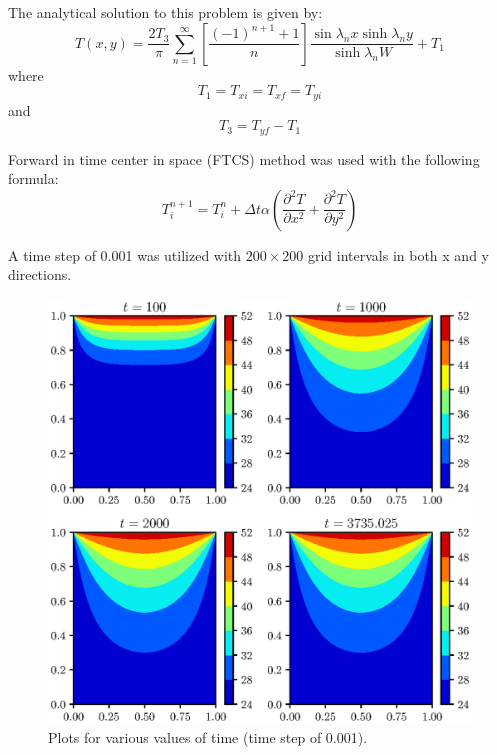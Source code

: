 \documentclass[12pt,a4paper,fleqn]{article}
\begin{document}
The analytical solution to this problem is given by:
\begin{equation}
T(x, y) =
\frac{2T_3}{\pi}\sum\limits_{n=1}^{\infty}\left[\frac{(-1)^{n+1}+1}{n}\right]
\frac{\sin\lambda_nx\sinh\lambda_ny}{\sinh\lambda_nW} + T_1\end{equation}
where
\begin{equation}
T_1 = T_{xi} = T_{xf} = T_{yi}
\end{equation}
and
\begin{equation}
T_3 = T_{yf} - T_1
\end{equation}

Forward in time center in space (FTCS) method was used with the following
formula:
\begin{equation}
T_i^{n+1} = T_i^n + \Delta t \alpha(\frac{\partial^2T}{\partial x^2} +
\frac{\partial^2T}{\partial y^2})
\end{equation}

A time step of 0.001 was utilized with $200\times200$ grid intervals in both x
and y directions. %

\begin{figure}[p!]
\centering
\includegraphics[width=\linewidth]{ht2dCase01.eps}
\caption{Plots for various values of time (time step of 0.001).}
\end{figure}
\end{document}
